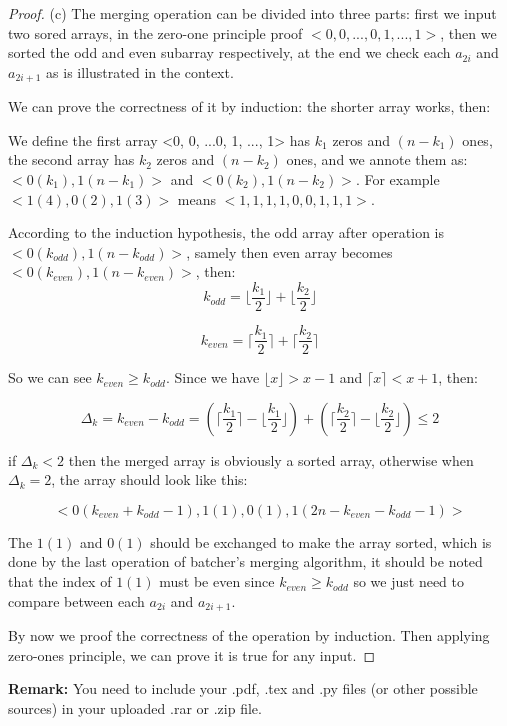 \documentclass[12pt,a4paper]{article}
\theoremstyle{definition}
\begin{document}
\begin{enumerate}
\begin{proof}
	(c) The merging operation can be divided into three parts: first we input two sored arrays, in the zero-one principle proof $<0, 0, ..., 0, 1, ..., 1>$, then we 
	sorted the odd and even subarray respectively, at the end we check each $a_{2i}$ and $a_{2i+1}$ as is illustrated in the context.
	
	We can prove the correctness of it by induction: the shorter array works, then:

	We define the first array <0, 0, ...0, 1, ..., 1> has $k_1$ zeros and $(n - k_1)$ ones, the second array has $k_2$ zeros and $(n - k_2)$ ones, and we annote them as:
	$<0(k_1), 1(n - k_1)>$ and $<0(k_2), 1(n - k_2)>$. For example $<1(4), 0(2), 1(3)>$ means $<1, 1, 1, 1, 0, 0, 1, 1, 1>$.

	According to the induction hypothesis, the odd array after operation is $<0(k_{odd}), 1(n - k_{odd})>$, samely then even array becomes $<0(k_{even}), 1(n - k_{even})>$, then:
	\begin{equation*}
        k_{odd} = \lfloor  \frac{k_1}{2}  \rfloor + \lfloor  \frac{k_2}{2} \rfloor
	\end{equation*}

	\begin{equation*}
        k_{even} = \lceil  \frac{k_1}{2}  \rceil + \lceil \frac{k_2}{2} \rceil
	\end{equation*}
	
	So we can see $k_{even} \geq k_{odd}$. Since we have $\lfloor x \rfloor > x - 1$ and $\lceil x \rceil < x + 1$, then:
	
	\begin{equation*}
       \Delta_{k} = k_{even} - k_{odd} = (\lceil \frac{k_1}{2}  \rceil - \lfloor  \frac{k_1}{2}  \rfloor) + (\lceil \frac{k_2}{2}  \rceil - \lfloor \frac{k_2}{2} \rfloor) \leq 2
	\end{equation*}
	
	if $\Delta_{k}<2$ then the merged array is obviously a sorted array, otherwise when $\Delta_{k} = 2$, the array should look like this:

	\begin{equation*}
         <0(k_{even} + k_{odd} - 1), 1(1), 0(1), 1(2n - k_{even} - k_{odd} - 1)>
	\end{equation*}
	
	The $1(1)$ and $0(1)$ should be exchanged to make the array sorted, which is done by the last operation of batcher's merging algorithm, it should be noted that the index of $1(1)$ must be 
	even since $k_{even} \geq k_{odd}$ so we just need to compare between each $a_{2i}$ and $a_{2i+1}$.
	
	By now we proof the correctness of the operation by induction. Then applying zero-ones principle, we can prove it is true for any input.
	
\end{proof}

\end{enumerate}



\vspace{20pt}

\textbf{Remark:} You need to include your .pdf, .tex and .py files (or other possible sources) in your uploaded .rar or .zip file.

\end{document}
